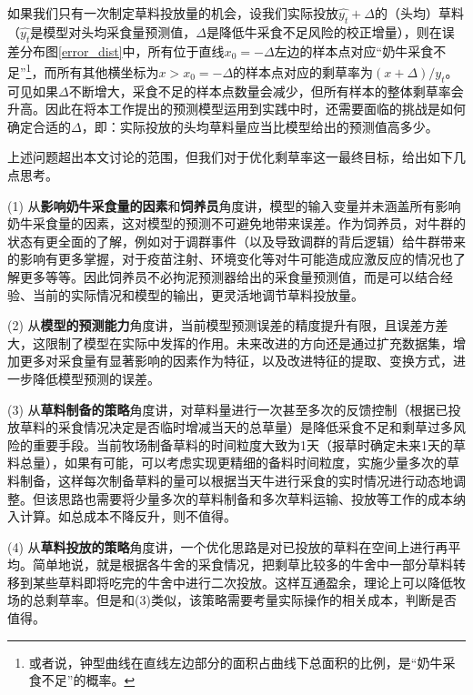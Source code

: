 如果我们只有一次制定草料投放量的机会，设我们实际投放$\hat {y_t} + \Delta$的（头均）草料（$\hat {y_t}$是模型对头均采食量预测值，$\Delta$是降低牛采食不足风险的校正增量），则在误差分布图\ref{error_dist}中，所有位于直线$x_0=-\Delta$左边的样本点对应“奶牛采食不足”\footnote{或者说，钟型曲线在直线左边部分的面积占曲线下总面积的比例，是“奶牛采食不足”的概率。}，而所有其他横坐标为$x > x_0 = -\Delta$的样本点对应的剩草率为$(x + \Delta) / y_t$。可见如果$\Delta$不断增大，采食不足的样本点数量会减少，但所有样本的整体剩草率会升高。因此在将本工作提出的预测模型运用到实践中时，还需要面临的挑战是如何确定合适的$\Delta$，即：实际投放的头均草料量应当比模型给出的预测值高多少。

上述问题超出本文讨论的范围，但我们对于优化剩草率这一最终目标，给出如下几点思考。

(1) 从\textbf{影响奶牛采食量的因素}和\textbf{饲养员}角度讲，模型的输入变量并未涵盖所有影响奶牛采食量的因素，这对模型的预测不可避免地带来误差。作为饲养员，对牛群的状态有更全面的了解，例如对于调群事件（以及导致调群的背后逻辑）给牛群带来的影响有更多掌握，对于疫苗注射、环境变化等对牛可能造成应激反应的情况也了解更多等等。因此饲养员不必拘泥预测器给出的采食量预测值，而是可以结合经验、当前的实际情况和模型的输出，更灵活地调节草料投放量。

(2) 从\textbf{模型的预测能力}角度讲，当前模型预测误差的精度提升有限，且误差方差大，这限制了模型在实际中发挥的作用。未来改进的方向还是通过扩充数据集，增加更多对采食量有显著影响的因素作为特征，以及改进特征的提取、变换方式，进一步降低模型预测的误差。

(3) 从\textbf{草料制备的策略}角度讲，对草料量进行一次甚至多次的反馈控制（根据已投放草料的采食情况决定是否临时增减当天的总草量）是降低采食不足和剩草过多风险的重要手段。当前牧场制备草料的时间粒度大致为1天（报草时确定未来1天的草料总量），如果有可能，可以考虑实现更精细的备料时间粒度，实施少量多次的草料制备，这样每次制备草料的量可以根据当天牛进行采食的实时情况进行动态地调整。但该思路也需要将少量多次的草料制备和多次草料运输、投放等工作的成本纳入计算。如总成本不降反升，则不值得。

(4) 从\textbf{草料投放的策略}角度讲，一个优化思路是对已投放的草料在空间上进行再平均。简单地说，就是根据各牛舍的采食情况，把剩草比较多的牛舍中一部分草料转移到某些草料即将吃完的牛舍中进行二次投放。这样互通盈余，理论上可以降低牧场的总剩草率。但是和(3)类似，该策略需要考量实际操作的相关成本，判断是否值得。







